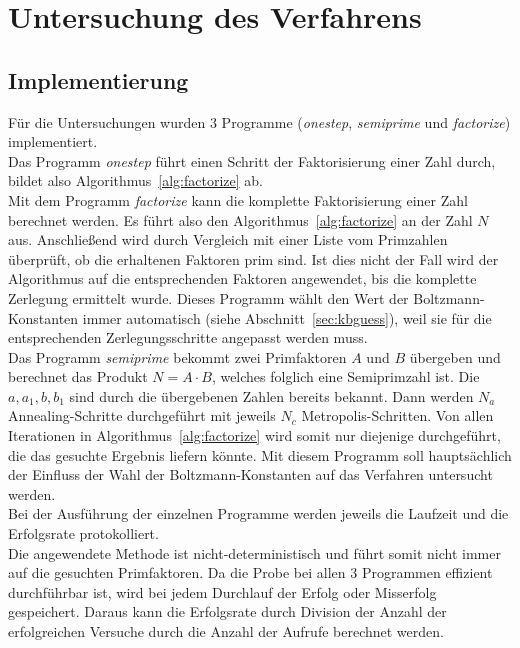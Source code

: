\chapter{Untersuchung des Verfahrens}\label{ch:results}



\section{Implementierung}
Für die Untersuchungen wurden $3$ Programme (\textit{onestep}, \textit{semiprime} und \textit{factorize}) implementiert.  \\
Das Programm \textit{onestep} führt einen Schritt der Faktorisierung einer Zahl durch, bildet also Algorithmus~\ref{alg:factorize} ab. \\
Mit dem Programm \textit{factorize} kann die komplette Faktorisierung einer Zahl berechnet werden. Es führt also den Algorithmus~\ref{alg:factorize} an der Zahl $N$ aus. Anschließend wird durch Vergleich mit einer Liste vom Primzahlen überprüft, ob die erhaltenen Faktoren prim sind. Ist dies nicht der Fall wird der Algorithmus auf die entsprechenden Faktoren angewendet, bis die komplette Zerlegung ermittelt wurde. Dieses Programm wählt den Wert der Boltzmann-Konstanten immer automatisch (siehe Abschnitt~\ref{sec:kbguess}), weil sie für die entsprechenden Zerlegungsschritte angepasst werden muss.\\
Das Programm \textit{semiprime} bekommt zwei Primfaktoren $A$ und $B$ übergeben und berechnet das Produkt $N=A\cdot B$, welches folglich eine Semiprimzahl ist. Die $a, a_1, b, b_1$ sind durch die übergebenen Zahlen bereits bekannt. Dann werden $N_a$ Annealing-Schritte durchgeführt mit jeweils $N_c$ Metropolis-Schritten. Von allen Iterationen in Algorithmus~\ref{alg:factorize} wird somit nur diejenige durchgeführt, die das gesuchte Ergebnis liefern könnte. Mit diesem Programm soll hauptsächlich der Einfluss der Wahl der Boltzmann-Konstanten auf das Verfahren untersucht werden. \\
Bei der Ausführung der einzelnen Programme werden jeweils die Laufzeit und die Erfolgsrate protokolliert. \\
Die angewendete Methode ist nicht-deterministisch und führt somit nicht immer auf die gesuchten Primfaktoren. Da die Probe bei allen $3$ Programmen effizient durchführbar ist, wird bei jedem Durchlauf der Erfolg oder Misserfolg gespeichert. Daraus kann die Erfolgsrate durch Division der Anzahl der erfolgreichen Versuche durch die Anzahl der Aufrufe berechnet werden. \\
